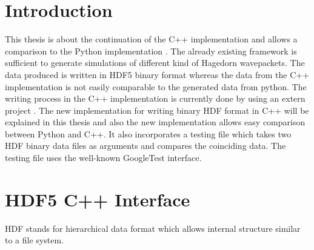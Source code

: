 \documentclass{article}
\begin{document}



\tableofcontents
\clearpage

\section{Introduction}
This thesis is about the continuation of the C++ implementation \cite{libwaveblocks} and allows a comparison to the Python implementation \cite{waveblocksnd}. The already existing framework is sufficient to generate simulations of different kind of Hagedorn wavepackets. The data produced is written in HDF5 binary format whereas the data from the C++ implementation is not easily comparable to the generated data from python. The writing process in the C++ implementation is currently done by using an extern project \cite{eigen3-hdf5}. The new implementation for writing binary HDF format in C++ will be explained in this thesis and also the new implementation allows easy comparison between Python and C++. It also incorporates a testing file which takes two HDF binary data files as arguments and compares the coinciding data. The testing file uses the well-known GoogleTest interface\cite{googletest}.

\section{HDF5 C++ Interface}
HDF stands for hierarchical data format which allows internal structure similar to a file system.
\end{document}
